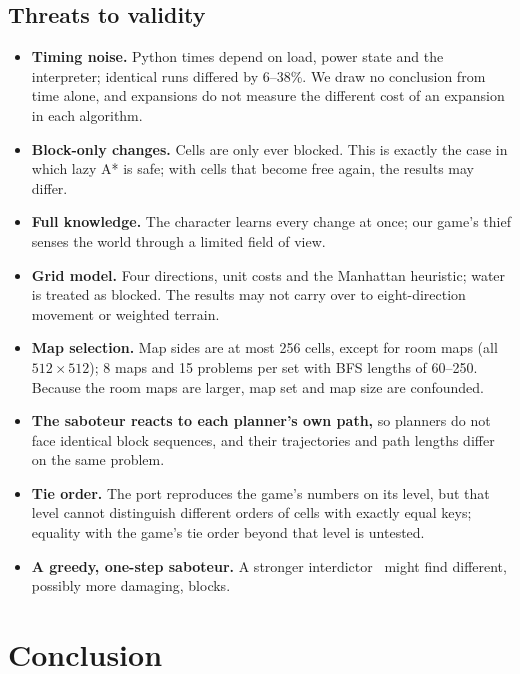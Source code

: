 \documentclass[conference,12pt]{IEEEtran}
\begin{document}
\subsection{Threats to validity}
\begin{itemize}
\item \textbf{Timing noise.} Python times depend on load, power state and the interpreter;
      identical runs differed by 6--38\%. We draw no conclusion from time alone, and expansions
      do not measure the different cost of an expansion in each algorithm.
\item \textbf{Block-only changes.} Cells are only ever blocked. This is exactly the case in which
      lazy A* is safe; with cells that become free again, the results may differ.
\item \textbf{Full knowledge.} The character learns every change at once; our game's thief senses
      the world through a limited field of view.
\item \textbf{Grid model.} Four directions, unit costs and the Manhattan heuristic; water is treated
      as blocked. The results may not carry over to eight-direction movement or weighted terrain.
\item \textbf{Map selection.} Map sides are at most 256 cells, except for room maps (all
      $512\times512$); 8 maps and 15 problems per set with BFS lengths of 60--250. Because the room
      maps are larger, map set and map size are confounded.
\item \textbf{The saboteur reacts to each planner's own path,} so planners do not face identical
      block sequences, and their trajectories and path lengths differ on the same problem.
\item \textbf{Tie order.} The port reproduces the game's numbers on its level, but that level cannot
      distinguish different orders of cells with exactly equal keys; equality with the game's tie
      order beyond that level is untested.
\item \textbf{A greedy, one-step saboteur.} A stronger interdictor~\cite{israeli2002interdiction}
      might find different, possibly more damaging, blocks.
\end{itemize}

\section{Conclusion}
\label{sec:conclusion}
\end{document}
